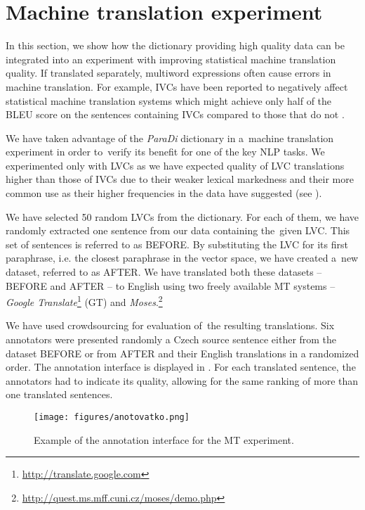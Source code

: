 \documentclass[output=paper
,modfonts
,nonflat]{langsci/langscibook}
\def\footurl#1{\footnote{\url{#1}}}
\begin{document}
\section{Machine translation experiment}
\label{evaluation}
In this section, we show how the dictionary providing high quality data 
can be integrated into an experiment with improving statistical machine 
translation quality. 
If translated separately, multiword expressions often cause errors in 
machine translation. For example, IVCs have been reported to negatively affect 
statistical machine translation systems which might achieve only half of the 
BLEU score \citep{Papineni:2002} on the sentences containing IVCs compared to 
those that do not \citep{SaltonRK14}. 

We have taken advantage of the \emph{ParaDi} dictionary 
in a~machine translation experiment in order to~verify its benefit for one of 
the key NLP tasks. We experimented only with LVCs as we have expected quality 
of LVC translations higher than those of IVCs due to their weaker lexical 
markedness and their more common use as their higher frequencies in the data 
have suggested (see ).

We have selected 50 random LVCs from the dictionary. For each of them, we have 
randomly extracted one sentence from our data containing the~given LVC. This set 
of sentences is referred to as BEFORE. By substituting the LVC for its first 
paraphrase, i.e. the closest paraphrase in the vector space, we have created 
a~new dataset, referred to as AFTER. We have translated both these datasets -- 
BEFORE and AFTER -- to English using two freely available MT systems -- 
\textit{Google Translate}\footurl{http://translate.google.com} (GT) and 
\textit{Moses}.\footurl{http://quest.ms.mff.cuni.cz/moses/demo.php}

We have used crowdsourcing for evaluation of~the resulting translations. Six 
annotators were presented randomly a Czech source sentence either from the 
dataset BEFORE or from AFTER and their English translations in a 
randomized order. The annotation interface is displayed in . 
For each translated sentence, the annotators had to indicate its quality, 
allowing for the same ranking of more than one translated sentences.

\begin{figure}[tb]
\texttt{[image: figures/anotovatko.png]} 
\caption{Example of the annotation interface for the MT experiment.}
\label{interface}
\end{figure}
\end{document}
